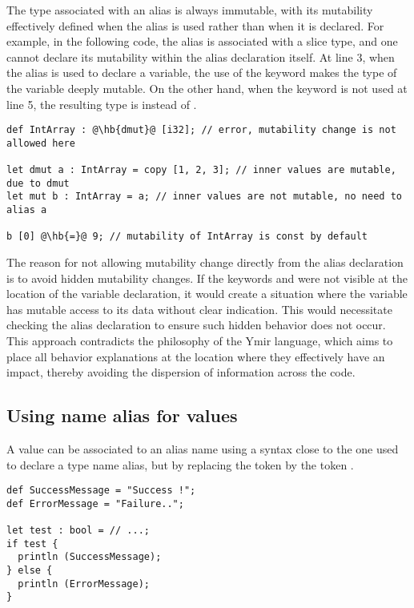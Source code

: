 The type associated with an alias is always immutable, with its mutability
effectively defined when the alias is used rather than when it is declared. For
example, in the following code, the alias  is associated with a
\token{[i32]} slice type, and one cannot declare its mutability within the alias
declaration itself. At line 3, when the alias  is used to
declare a variable, the use of the keyword  makes the type of the
variable deeply mutable. On the other hand, when the keyword  is not
used at line 5, the resulting type is  instead of .

\begin{lstlisting}[style=coloredverbatim, escapechar=@]
def IntArray : @\hb{dmut}@ [i32]; // error, mutability change is not allowed here

let dmut a : IntArray = copy [1, 2, 3]; // inner values are mutable, due to dmut
let mut b : IntArray = a; // inner values are not mutable, no need to alias a

b [0] @\hb{=}@ 9; // mutability of IntArray is const by default
\end{lstlisting}

The reason for not allowing mutability change directly from the alias
declaration is to avoid hidden mutability changes. If the keywords 
and  were not visible at the location of the variable declaration,
it would create a situation where the variable has mutable access to its data
without clear indication. This would necessitate checking the alias declaration
to ensure such hidden behavior does not occur. This approach contradicts the
philosophy of the Ymir language, which aims to place all behavior explanations
at the location where they effectively have an impact, thereby avoiding the
dispersion of information across the code.

\subsection{Using name alias for values}

A value can be associated to an alias name using a syntax close to the one used
to declare a type name alias, but by replacing the token \token{:} by the token
\token{=}.

\begin{lstlisting}[style=coloredverbatim]
def SuccessMessage = "Success !";
def ErrorMessage = "Failure..";

let test : bool = // ...;
if test {
  println (SuccessMessage);
} else {
  println (ErrorMessage);
}
\end{lstlisting}

